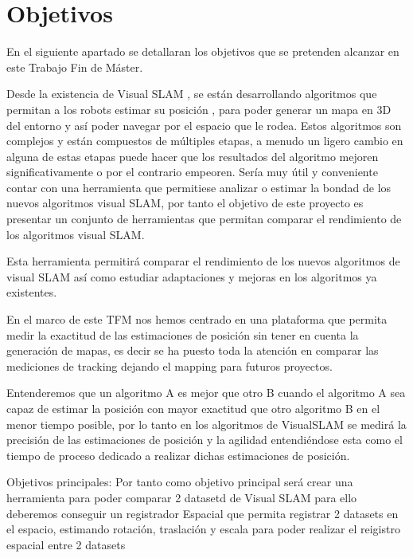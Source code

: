 \chapter{Objetivos} \label{cap:Objetivos}


En el siguiente apartado se detallaran los objetivos que se pretenden alcanzar en este Trabajo Fin de Máster.

Desde la existencia de Visual SLAM , se están desarrollando algoritmos que permitan a los robots estimar su posición , para poder generar un mapa en 3D del entorno y así poder navegar por el espacio que le rodea. Estos algoritmos son complejos y están compuestos de múltiples etapas, a menudo un ligero cambio en alguna de estas etapas puede hacer que los resultados del algoritmo mejoren significativamente o por el contrario empeoren. Sería muy útil y conveniente contar con una herramienta que permitiese analizar o estimar la bondad de los nuevos algoritmos visual SLAM, por tanto el objetivo de este proyecto es presentar un conjunto de herramientas que permitan comparar el rendimiento de los algoritmos visual SLAM.

Esta herramienta permitirá comparar el rendimiento de los nuevos algoritmos de visual SLAM así como estudiar adaptaciones y mejoras en los algoritmos ya existentes.

En el marco de este TFM nos hemos centrado en una plataforma que permita medir la exactitud de las estimaciones de posición sin tener en cuenta la generación de mapas, es decir se ha puesto toda la atención en comparar las mediciones de tracking dejando el mapping para futuros proyectos. 

Entenderemos que un algoritmo A es mejor que otro B cuando el algoritmo A sea capaz de estimar la posición con mayor exactitud que otro algoritmo B en el menor tiempo posible, por lo tanto en los algoritmos de VisualSLAM se medirá la precisión de las estimaciones de posición y la agilidad entendiéndose esta como el tiempo de proceso dedicado a realizar dichas estimaciones de posición. 


Objetivos principales: 
Por tanto como objetivo principal será crear una herramienta para poder comparar 2 datasetd de Visual SLAM
para ello deberemos conseguir un registrador Espacial que permita registrar 2 datasets en el espacio, estimando rotación, traslación y escala para poder realizar el reigistro espacial entre 2 datasets



